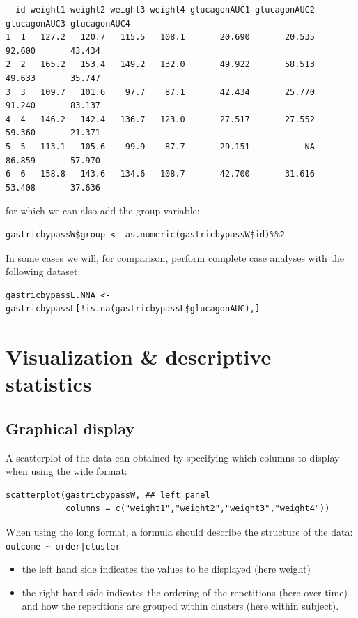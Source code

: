 \documentclass[12pt]{article}
\begin{document}
\begin{verbatim}
  id weight1 weight2 weight3 weight4 glucagonAUC1 glucagonAUC2 glucagonAUC3 glucagonAUC4
1  1   127.2   120.7   115.5   108.1       20.690       20.535       92.600       43.434
2  2   165.2   153.4   149.2   132.0       49.922       58.513       49.633       35.747
3  3   109.7   101.6    97.7    87.1       42.434       25.770       91.240       83.137
4  4   146.2   142.4   136.7   123.0       27.517       27.552       59.360       21.371
5  5   113.1   105.6    99.9    87.7       29.151           NA       86.859       57.970
6  6   158.8   143.6   134.6   108.7       42.700       31.616       53.408       37.636
\end{verbatim}


for which we can also add the group variable:
\lstset{language=r,label= ,caption= ,captionpos=b,numbers=none}
\begin{lstlisting}
gastricbypassW$group <- as.numeric(gastricbypassW$id)%%2
\end{lstlisting}

In some cases we will, for comparison, perform complete case analyses
with the following dataset:
\lstset{language=r,label= ,caption= ,captionpos=b,numbers=none}
\begin{lstlisting}
gastricbypassL.NNA <- gastricbypassL[!is.na(gastricbypassL$glucagonAUC),]
\end{lstlisting}

\clearpage

\section{Visualization \& descriptive statistics}
\label{sec:org306d0f8}
\subsection{Graphical display}
\label{sec:orgafc0d5e}

A scatterplot of the data can obtained by specifying which columns to
display when using the wide format:
\lstset{language=r,label= ,caption= ,captionpos=b,numbers=none}
\begin{lstlisting}
scatterplot(gastricbypassW, ## left panel
            columns = c("weight1","weight2","weight3","weight4")) 
\end{lstlisting}

\noindent When using the long format, a formula should describe the
structure of the data: \texttt{outcome \textasciitilde{} order|cluster}
\begin{itemize}
\item the left hand side indicates the values to be displayed (here weight)
\item the right hand side indicates the ordering of the repetitions (here over time) and
how the repetitions are grouped within clusters (here within subject).
\end{itemize}
\end{document}
